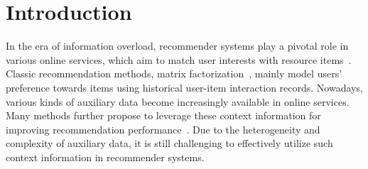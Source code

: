 \section{Introduction}
In the era of information overload, recommender systems play a pivotal role in various online services, which aim to match user interests with resource items~\cite{sarwar2001item}.
Classic recommendation methods, \eg matrix factorization~\cite{koren2015advances}, mainly model users' preference towards items using historical user-item interaction records. Nowadays, various kinds of auxiliary data become increasingly available in online services. Many methods further propose to leverage these context information for improving recommendation performance~\cite{ronen2016recommendations,adomavicius2015context}.
Due to the heterogeneity and complexity of auxiliary data, it is still challenging to effectively utilize such context information in recommender systems.




